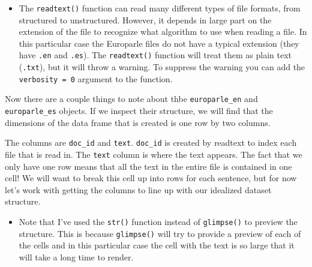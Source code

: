 \documentclass[
]{article}
\newenvironment{Shaded}{\begin{snugshade}}{\end{snugshade}}
\newcommand{\CommentTok}[1]{\textcolor[rgb]{0.56,0.35,0.01}{\textit{#1}}}
\newcommand{\FunctionTok}[1]{\textcolor[rgb]{0.00,0.00,0.00}{#1}}
\newcommand{\NormalTok}[1]{#1}
\newenvironment{rmdblock}[1]
  {\begin{shaded*}
  \begin{itemize}
  \renewcommand{\labelitemi}{
    \raisebox{-.5\height}[0pt][0pt]{
      {\setkeys{Gin}{width=2em,keepaspectratio}\texttt{[image: assets/images/\#1]}}
    }
  }
  \item
  }
  {
  \end{itemize}
  \end{shaded*}
  }
\newenvironment{rmdtip}
  {\begin{rmdblock}{tip}}
  {\end{rmdblock}}
\begin{document}
\begin{rmdtip}
The \texttt{readtext()} function can read many different types of file
formats, from structured to unstructured. However, it depends in large
part on the extension of the file to recognize what algorithm to use
when reading a file. In this particular case the Europarle files do not
have a typical extension (they have \texttt{.en} and \texttt{.es}). The
\texttt{readtext()} function will treat them as plain text
(\texttt{.txt}), but it will throw a warning. To suppress the warning
you can add the \texttt{verbosity\ =\ 0} argument to the function.
\end{rmdtip}

Now there are a couple things to note about thbe \texttt{europarle\_en} and \texttt{europarle\_es} objects. If we inspect their structure, we will find that the dimensions of the data frame that is created is one row by two columns.

\begin{Shaded}
\end{Shaded}

The columns are \texttt{doc\_id} and \texttt{text}. \texttt{doc\_id} is created by readtext to index each file that is read in. The \texttt{text} column is where the text appears. The fact that we only have one row means that all the text in the entire file is contained in one cell! We will want to break this cell up into rows for each sentence, but for now let's work with getting the columns to line up with our idealized dataset structure.

\begin{rmdtip}
Note that I've used the \texttt{str()} function instead of
\texttt{glimpse()} to preview the structure. This is because
\texttt{glimpse()} will try to provide a preview of each of the cells
and in this particular case the cell with the text is so large that it
will take a long time to render.
\end{rmdtip}
\end{document}
